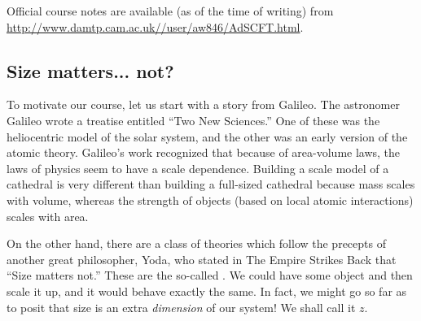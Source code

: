 \begin{note}
Official course notes are available (as of the time of writing) from \url{http://www.damtp.cam.ac.uk//user/aw846/AdSCFT.html}.
\end{note}

\subsection*{Size matters... not?}
To motivate our course, let us start with a story from Galileo. The astronomer Galileo wrote a treatise entitled ``Two New Sciences.'' One of these was the heliocentric model of the solar system, and the other was an early version of the atomic theory. Galileo's work recognized that because of area-volume laws, the laws of physics seem to have a scale dependence. Building a scale model of a cathedral is very different than building a full-sized cathedral because mass scales with volume, whereas the strength of objects (based on local atomic interactions) scales with area.

On the other hand, there are a class of theories which follow the precepts of another great philosopher, Yoda, who stated in The Empire Strikes Back that ``Size matters not.'' These are the so-called . We could have some object and then scale it up, and it would behave exactly the same. In fact, we might go so far as to posit that size is an extra \emph{dimension} of our system! We shall call it $z$.

